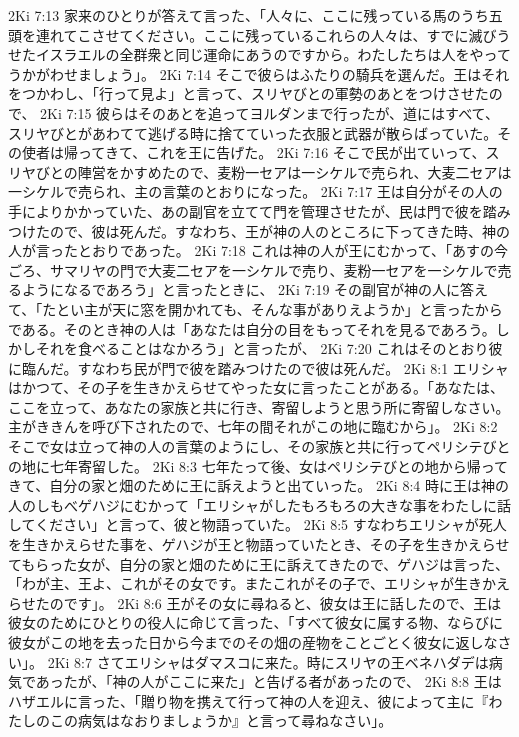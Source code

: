 2Ki 7:13  家来のひとりが答えて言った、「人々に、ここに残っている馬のうち五頭を連れてこさせてください。ここに残っているこれらの人々は、すでに滅びうせたイスラエルの全群衆と同じ運命にあうのですから。わたしたちは人をやってうかがわせましょう」。
2Ki 7:14  そこで彼らはふたりの騎兵を選んだ。王はそれをつかわし、「行って見よ」と言って、スリヤびとの軍勢のあとをつけさせたので、
2Ki 7:15  彼らはそのあとを追ってヨルダンまで行ったが、道にはすべて、スリヤびとがあわてて逃げる時に捨てていった衣服と武器が散らばっていた。その使者は帰ってきて、これを王に告げた。
2Ki 7:16  そこで民が出ていって、スリヤびとの陣営をかすめたので、麦粉一セアは一シケルで売られ、大麦二セアは一シケルで売られ、主の言葉のとおりになった。
2Ki 7:17  王は自分がその人の手によりかかっていた、あの副官を立てて門を管理させたが、民は門で彼を踏みつけたので、彼は死んだ。すなわち、王が神の人のところに下ってきた時、神の人が言ったとおりであった。
2Ki 7:18  これは神の人が王にむかって、「あすの今ごろ、サマリヤの門で大麦二セアを一シケルで売り、麦粉一セアを一シケルで売るようになるであろう」と言ったときに、
2Ki 7:19  その副官が神の人に答えて、「たとい主が天に窓を開かれても、そんな事がありえようか」と言ったからである。そのとき神の人は「あなたは自分の目をもってそれを見るであろう。しかしそれを食べることはなかろう」と言ったが、
2Ki 7:20  これはそのとおり彼に臨んだ。すなわち民が門で彼を踏みつけたので彼は死んだ。
2Ki 8:1  エリシャはかつて、その子を生きかえらせてやった女に言ったことがある。「あなたは、ここを立って、あなたの家族と共に行き、寄留しようと思う所に寄留しなさい。主がききんを呼び下されたので、七年の間それがこの地に臨むから」。
2Ki 8:2  そこで女は立って神の人の言葉のようにし、その家族と共に行ってペリシテびとの地に七年寄留した。
2Ki 8:3  七年たって後、女はペリシテびとの地から帰ってきて、自分の家と畑のために王に訴えようと出ていった。
2Ki 8:4  時に王は神の人のしもべゲハジにむかって「エリシャがしたもろもろの大きな事をわたしに話してください」と言って、彼と物語っていた。
2Ki 8:5  すなわちエリシャが死人を生きかえらせた事を、ゲハジが王と物語っていたとき、その子を生きかえらせてもらった女が、自分の家と畑のために王に訴えてきたので、ゲハジは言った、「わが主、王よ、これがその女です。またこれがその子で、エリシャが生きかえらせたのです」。
2Ki 8:6  王がその女に尋ねると、彼女は王に話したので、王は彼女のためにひとりの役人に命じて言った、「すべて彼女に属する物、ならびに彼女がこの地を去った日から今までのその畑の産物をことごとく彼女に返しなさい」。
2Ki 8:7  さてエリシャはダマスコに来た。時にスリヤの王ベネハダデは病気であったが、「神の人がここに来た」と告げる者があったので、
2Ki 8:8  王はハザエルに言った、「贈り物を携えて行って神の人を迎え、彼によって主に『わたしのこの病気はなおりましょうか』と言って尋ねなさい」。
